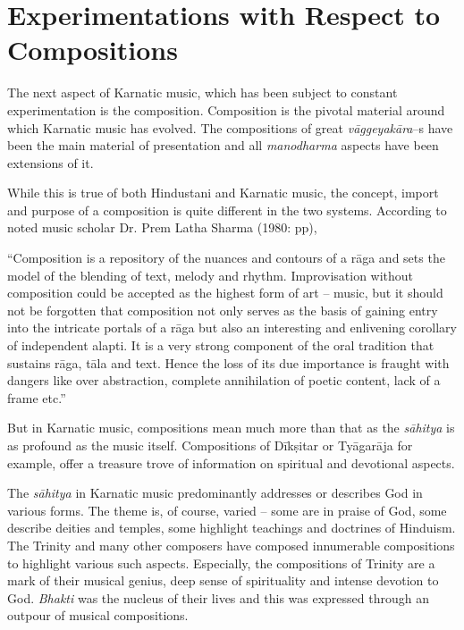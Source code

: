 \section*{Experimentations with Respect to Compositions}

The next aspect of Karnatic music, which has been subject to constant experimentation is the composition. Composition is the pivotal material around which Karnatic music has evolved. The compositions of great \textit{vāggeyakāra}–s have been the main material of presentation and all \textit{manodharma} aspects have been extensions of it.

While this is true of both Hindustani and Karnatic music, the concept, import and purpose of a composition is quite different in the two systems. According to noted music scholar Dr. Prem Latha Sharma (1980: pp),

\begin{myquote}
“Composition is a repository of the nuances and contours of a rāga and sets the model of the blending of text, melody and rhythm. Improvisation without composition could be accepted as the highest form of art – music, but it should not be forgotten that composition not only serves as the basis of gaining entry into the intricate portals of a rāga but also an interesting and enlivening corollary of independent alapti. It is a very strong component of the oral tradition that sustains rāga, tāla and text. Hence the loss of its due importance is fraught with dangers like over abstraction, complete annihilation of poetic content, lack of a frame etc.”
\end{myquote}

But in Karnatic music, compositions mean much more than that as the \textit{sāhitya} is as profound as the music itself. Compositions of Dīkṣitar or Tyāgarāja for example, offer a treasure trove of information on spiritual and devotional aspects.

The \textit{sāhitya} in Karnatic music predominantly addresses or describes God in various forms. The theme is, of course, varied – some are in praise of God, some describe deities and temples, some highlight teachings and doctrines of Hinduism. The Trinity and many other composers have composed innumerable compositions to highlight various such aspects. Especially, the compositions of Trinity are a mark of their musical genius, deep sense of spirituality and intense devotion to God. \textit{Bhakti} was the nucleus of their lives and this was expressed through an outpour of musical compositions.


